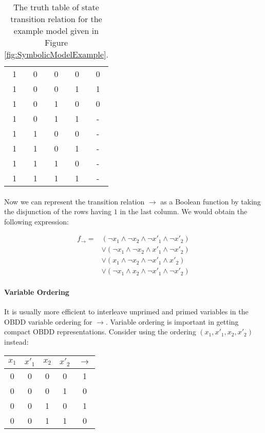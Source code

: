 \documentclass{article}
\theoremstyle{plain}
\theoremstyle{definition}
\begin{document}
\begin{multicols}{2}
\begin{table}[H]
\begin{tabular}{ c c | c c | c }
1 & 0 & 0 & 0 & 0\\
1 & 0 & 0 & 1 & 1\\
1 & 0 & 1 & 0 & 0\\
1 & 0 & 1 & 1 & -\\
\hline

1 & 1 & 0 & 0 & -\\
1 & 1 & 0 & 1 & -\\
1 & 1 & 1 & 0 & -\\
1 & 1 & 1 & 1 & -\\

\end{tabular}
\caption{The truth table of state transition relation for the example model given in Figure \ref{fig:SymbolicModelExample}.}
\end{table}

\paragraph{} Now we can represent the transition relation $\rightarrow$ as a Boolean function by taking the disjunction of the rows having $1$ in the last column. We would obtain the following expression:

\begin{align*}
f_\rightarrow = &(\lnot x_1 \land \lnot x_2 \land \lnot x'_1 \land \lnot x'_2)\\
&\lor (\lnot x_1 \land \lnot x_2 \land x'_1 \land \lnot x'_2)\\
&\lor (x_1 \land \lnot x_2 \land \lnot x'_1 \land x'_2)\\
&\lor (\lnot x_1 \land x_2 \land \lnot x'_1 \land \lnot x'_2)
\end{align*}

\paragraph{Variable Ordering} It is usually more efficient to interleave unprimed and primed variables in the OBDD variable ordering for $\rightarrow$. Variable ordering is important in getting compact OBDD representations. Consider using the ordering $(x_1, x'_1, x_2, x'_2)$ instead:

\begin{table}[H]
\centering
\begin{tabular}{ c c | c c | c }
$x_1$ & $x'_1$ & $x_2$ & $x'_2$ & $\rightarrow$ \\
\hline

0 & 0 & 0 & 0 & 1\\
0 & 0 & 0 & 1 & 0\\
0 & 0 & 1 & 0 & 1\\
0 & 0 & 1 & 1 & 0\\
\hline


\end{tabular}
\end{table}
\end{multicols}
\end{document}
